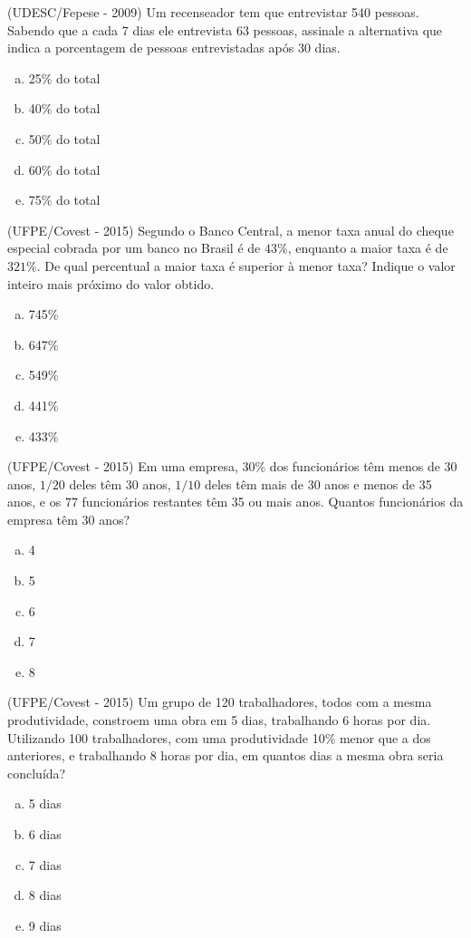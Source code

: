  \begin{exer}
 (UDESC/Fepese - 2009) Um recenseador tem que entrevistar 540 pessoas. Sabendo que a cada 7 dias ele entrevista 63 pessoas, assinale a alternativa que indica a porcentagem de pessoas entrevistadas após 30 dias.
  \begin{enumerate}[a)]
  \item 25\% do total
  \item 40\% do total
  \item 50\% do total
  \item 60\% do total
  \item 75\% do total
 \end{enumerate}
 \end{exer} 
 
 \begin{exer}
 (UFPE/Covest - 2015) Segundo o Banco Central, a menor taxa anual do cheque especial cobrada por um banco no Brasil é de $43\%$, enquanto a maior taxa é de $321\%$. De qual percentual a maior taxa é superior à menor taxa? Indique o valor inteiro mais próximo do valor obtido.
 \begin{enumerate}[a)]
 \item 745\%
 \item 647\%
 \item 549\%
 \item 441\%
 \item 433\%
 \end{enumerate}
 \end{exer} 
 
 \begin{exer}
 (UFPE/Covest - 2015) Em uma empresa, 30\% dos funcionários têm menos de 30 anos, $1/20$ deles têm 30 anos, $1/10$ deles têm mais de 30 anos e menos de 35 anos, e os 77 funcionários restantes têm 35 ou mais anos. Quantos funcionários da empresa têm 30 anos?
 \begin{enumerate}[a)]
 \item 4
 \item 5
 \item 6
 \item 7
 \item 8
 \end{enumerate}
 \end{exer} 
 
 \begin{exer}
 (UFPE/Covest - 2015) Um grupo de 120 trabalhadores, todos com a mesma produtividade, constroem uma obra em 5 dias, trabalhando 6 horas por dia. Utilizando 100 trabalhadores, com uma produtividade 10\% menor que a dos anteriores, e trabalhando 8 horas por dia, em quantos dias a mesma obra seria concluída?
 \begin{enumerate}[a)]
 \item 5 dias
 \item 6 dias
 \item 7 dias
 \item 8 dias
 \item 9 dias
 \end{enumerate}
 \end{exer} 
 
